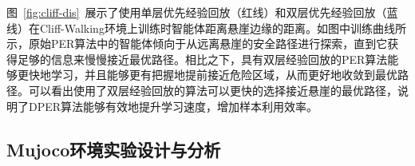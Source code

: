 图~\ref{fig:cliff-dis}~展示了使用单层优先经验回放（红线）和双层优先经验回放（蓝线）在Cliff-Walking环境上训练时智能体距离悬崖边缘的距离。如图中训练曲线所示，原始PER算法中的智能体倾向于从远离悬崖的安全路径进行探索，直到它获得足够的信息来慢慢接近最优路径。相比之下，具有双层经验回放的PER算法能够更快地学习，并且能够更有把握地提前接近危险区域，从而更好地收敛到最优路径。可以看出使用了双层经验回放的算法可以更快的选择接近悬崖的最优路径，说明了DPER算法能够有效地提升学习速度，增加样本利用效率。

\subsection{Mujoco环境实验设计与分析}

\begin{figure}[t]
    \centering
    \\
\end{figure}
